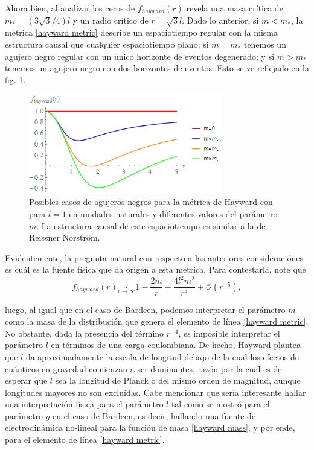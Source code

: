 \documentclass[16pt,a4paper]{article}
\numberwithin{equation}{section}
\theoremstyle{definition}
\begin{document}
Ahora bien, al analizar los ceros de $f_{hayward}(r)$ revela una masa crítica de $m_{*} = (3\sqrt{3}/4)l$ y un radio crítico de $r = \sqrt{3}l$. Dado lo anterior, si $m < m_{*}$, la métrica \ref{hayward metric} describe un espaciotiempo regular con la misma estructura causal que cualquier espaciotiempo plano; si $m = m_{*}$ tenemos un agujero negro regular con un único horizonte de eventos degenerado; y si $m > m_{*}$ tenemos un agujero negro con dos horizontes de eventos. Esto se ve reflejado en la fig. \ref{fig: fhayward analysis}. 
\begin{figure}[h!]
	\centering
	\includegraphics[width=0.75\textwidth]{fhaywardAnalysis}
	\caption{Posibles casos de agujeros negros para la métrica de Hayward con para $l=1$ en unidades naturales y diferentes valores del parámetro $m$. La estructura causal de este espaciotiempo es similar a la de Reissner Norström.}
	\label{fig: fhayward analysis}
\end{figure}

Evidentemente, la pregunta natural con respecto a las anteriores consideraciónes es cuál es la fuente física que da origen a esta métrica. Para contestarla, note que 
\begin{equation}
f_{hayward}(r) \underset{r \to \infty}{\sim} 1 - \frac{2m}{r} + \frac{4l^2m^2}{r^4} + \mathcal{O}(r^{-5}),
\end{equation}

luego, al igual que en el caso de Bardeen, podemos interpretar el parámetro $m$ como la masa de la distribución que genera el elemento de línea \eqref{hayward metric}. No obstante, dada la presencia del término $r^{-4}$, es imposible interpretar el parámetro $l$ en términos de una carga coulombiana. De hecho, Hayward plantea que $l$ da aproximadamente la escala de longitud debajo de la cual los efectos de cuánticos en gravedad comienzan a ser dominantes, razón por la cual es de esperar que $l$ sea la longitud de Planck o del mismo orden de magnitud, aunque longitudes mayores no son excluídas. Cabe mencionar que sería interesante hallar una interpretación física para el parámetro $l$ tal como se mostró para el parámetro $g$ en el caso de Bardeen, es decir, hallando una fuente de electrodinámica no-lineal para la función de masa \eqref{hayward mass}, y por ende, para el elemento de línea \eqref{hayward metric}. 
\end{document}
